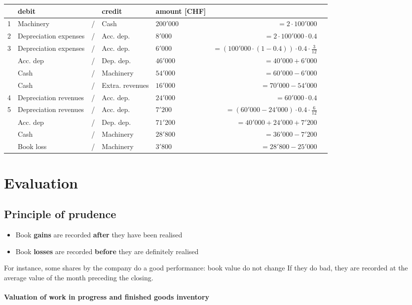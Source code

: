 \documentclass[a4paper] {scrartcl}
\begin{document}
\begin{tabular}{lllllrl}
	&\textbf{debit} & & \textbf{credit} & \textbf{amount} [CHF]&\\
	\hline
	1&Machinery & / &  Cash & $200'000$&$=2\cdot100'000$\\
	2&Depreciation expenses& / & Acc. dep. & $8'000$&$=2\cdot100'000\cdot0.4$\\
	3&Depreciation expenses& / & Acc. dep. & $6'000$&$=(100'000\cdot(1-0.4))\cdot0.4\cdot\frac{3}{12}$\\
	&Acc. dep& / & Dep. dep. & $46'000$&$=40'000+6'000$\\
	&Cash& / & Machinery & $54'000$&$=60'000-6'000$\\
	&Cash& / & Extra. revenues & $16'000$&$=70'000-54'000$\\
	
	4&Depreciation revenues& / & Acc. dep. & $24'000$&$=60'000\cdot0.4$\\
	5&Depreciation revenues& / & Acc. dep. & $7'200$&$=(60'000-24'000)\cdot0.4\cdot\frac{6}{12}$\\
	&Acc. dep& / & Dep. dep. & $71'200$&$=40'000+24'000+7'200$\\
	&Cash& / & Machinery & $28'800$& $=36'000-7'200$\\
	&Book loss& / & Machinery & $3'800$& $=28'800-25'000$\\
\end{tabular}

\section{Evaluation}
\subsection{Principle of prudence} %
\label{sub:principle_of_prudence}
\begin{itemize}
	\item Book \textbf{gains} are recorded \textbf{after} they have been realised
	\item Book \textbf{losses} are recorded \textbf{before} they are definitely realised
\end{itemize}

For instance, some shares by the company do a good performance: book value do not change
If they do bad, they are recorded at the average value of the month preceding the closing.

\paragraph{Valuation of work in progress and finished goods inventory} %
\label{par:valuation_of_work_in_progress_and_finished_goods_inventory}
\end{document}
